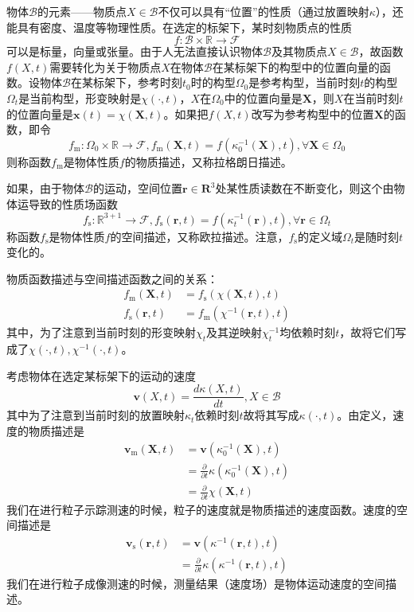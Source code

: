 \documentclass[main.tex]{subfiles}
\begin{document}
物体$\mathcal{B}$的元素——物质点$X\in\mathcal{B}$不仅可以具有“位置”的性质（通过放置映射$\kappa$），还能具有密度、温度等物理性质。在选定的标架下，某时刻物质点的性质
\[f:\mathcal{B}\times\mathbb{R}\rightarrow \mathcal{F}\]
可以是标量，向量或张量。由于人无法直接认识物体$\mathcal{B}$及其物质点$X\in\mathcal{B}$，故函数$f\left(X,t\right)$需要转化为关于物质点$X$在物体$\mathcal{B}$在某标架下的构型中的位置向量的函数。设物体$\mathcal{B}$在某标架下，参考时刻$t_0$时的构型$\Omega_0$是参考构型，当前时刻$t$的构型$\Omega_t$是当前构型，形变映射是$\chi\left(\cdot,t\right)$，$X$在$\Omega_0$中的位置向量是$\mathbf{X}$，则$X$在当前时刻$t$的位置向量是$\mathbf{x}\left(t\right)=\chi\left(\mathbf{X},t\right)$。如果把$f\left(X,t\right)$改写为参考构型中的位置$\mathbf{X}$的函数，即令
\[f_\mathrm{m}:\Omega_0\times\mathbb{R}\rightarrow\mathcal{F},f_\mathrm{m}\left(\mathbf{X},t\right)=f\left(\kappa_0^{-1}\left(\mathbf{X}\right),t\right),\forall\mathbf{X}\in\Omega_0\]
则称函数$f_\mathrm{m}$是物体性质$f$的物质描述，又称拉格朗日描述。

如果，由于物体$\mathcal{B}$的运动，空间位置$\mathbf{r}\in\mathbf{R}^3$处某性质读数在不断变化，则这个由物体运导致的性质场函数
\[f_\mathrm{s}:\mathbb{R}^{3+1}\rightarrow\mathcal{F},f_\mathrm{s}\left(\mathbf{r},t\right)=f\left(\kappa_t^{-1}\left(\mathbf{r}\right),t\right),\forall\mathbf{r}\in\Omega_t\]
称函数$f_\mathrm{s}$是物体性质$f$的空间描述，又称欧拉描述。注意，$f_\mathrm{s}$的定义域$\Omega_t$是随时刻$t$变化的。

物质函数描述与空间描述函数之间的关系：
\begin{align*}    
f_\mathrm{m}\left(\mathbf{X},t\right)&=f_\mathrm{s}\left(\chi\left(\mathbf{X},t\right),t\right)\\
f_\mathrm{s}\left(\mathbf{r},t\right)&=f_\mathrm{m}\left(\chi^{-1}\left(\mathbf{r},t\right),t\right)
\end{align*}
其中，为了注意到当前时刻的形变映射$\chi_t$及其逆映射$\chi_t^{-1}$均依赖时刻$t$，故将它们写成了$\chi\left(\cdot,t\right),\chi^{-1}\left(\cdot,t\right)$。

考虑物体在选定某标架下的运动的速度
\[\mathbf{v}\left(X,t\right)=\frac{d\kappa\left(X,t\right)}{dt},X\in\mathcal{B}\]
其中为了注意到当前时刻的放置映射$\kappa_t$依赖时刻$t$故将其写成$\kappa\left(\cdot,t\right)$。由定义，速度的物质描述是
\begin{align*}
\mathbf{v}_\mathrm{m}\left(\mathbf{X},t\right)&=\mathbf{v}\left(\kappa_0^{-1}\left(\mathbf{X}\right),t\right)\\
&=\frac{\partial}{\partial t}\kappa\left(\kappa_0^{-1}\left(\mathbf{X}\right),t\right)\\
&=\frac{\partial}{\partial t}\chi\left(\mathbf{X},t\right)
\end{align*}
我们在进行粒子示踪测速的时候，粒子的速度就是物质描述的速度函数。速度的空间描述是
\begin{align*}
\mathbf{v}_\mathrm{s}\left(\mathbf{r},t\right)&=\mathbf{v}\left(\kappa^{-1}\left(\mathbf{r},t\right),t\right)\\
&=\frac{\partial}{\partial t}\kappa\left(\kappa^{-1}\left(\mathbf{r},t\right),t\right)
\end{align*}
我们在进行粒子成像测速的时候，测量结果（速度场）是物体运动速度的空间描述。
\end{document}

